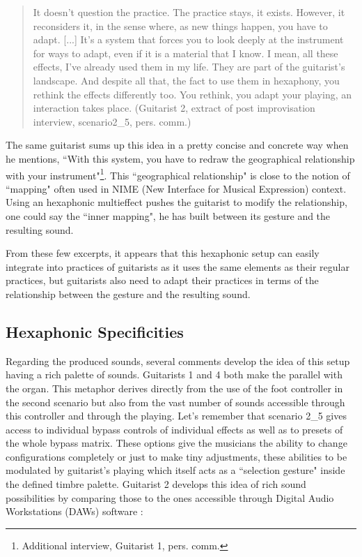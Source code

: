 \documentclass{article}
\begin{document}
    \begin{quote}
     It doesn't question the practice. The practice stays, it exists. However, it reconsiders it, in the sense where, as new things happen, you have to adapt. [...] It's a system that forces you to look deeply at the instrument for ways to adapt, even if it is a material that I know. I mean, all these effects, I've already used them in my life. They are part of the guitarist's landscape. And despite all that, the fact to use them in hexaphony, you rethink the effects differently too. You rethink, you adapt your playing, an interaction takes place. (Guitarist 2, extract of post improvisation interview, scenario2\_5, pers. comm.)
    \end{quote}

The same guitarist sums up this idea in a pretty concise and concrete way when he mentions, ``With this system, you have to redraw the geographical relationship with your instrument"\footnote{Additional interview, Guitarist 1, pers. comm.}. This ``geographical relationship" is close to the notion of ``mapping" often used in NIME (New Interface for Musical Expression) context. Using an hexaphonic multieffect pushes the guitarist to modify the relationship, one could say the ``inner mapping", he has built between its gesture and the resulting sound. 

From these few excerpts, it appears that this hexaphonic setup can easily integrate into practices of guitarists as it uses the same elements as their regular practices, but guitarists also need to adapt their practices in terms of the relationship between the gesture and the resulting sound.




\subsection{Hexaphonic Specificities}

Regarding the produced sounds, several comments develop the idea of this setup having a rich palette of sounds. Guitarists 1 and 4 both make the parallel with the organ. This metaphor derives directly from the use of the foot controller in the second scenario but also from the vast number of sounds accessible through this controller  and through the playing.  Let's remember that scenario 2\_5 gives access to individual bypass controls of individual effects as well as to presets of the whole bypass matrix. These options give the musicians the ability to change configurations completely or just to make tiny adjustments, these abilities to be modulated by guitarist's playing which itself acts as a ``selection gesture" \cite{sci:Cadoz94} inside the defined timbre palette.
Guitarist 2 develops this idea of rich sound possibilities by comparing those to the ones accessible through Digital Audio Workstations (DAWs) software : 
\end{document}
